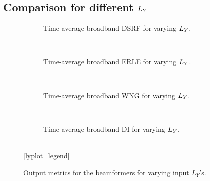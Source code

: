 \subsection{Comparison for different $\Ly$}
\begin{figure}[H]
	\centering
	\begin{subfigure}{0.48\textwidth}
		\centering
		
		\caption{Time-average broadband DSRF for varying $\Ly$.}
		\label{subfig:lineplot__DSRF__iSER_n15__Ly_var}
	\end{subfigure}\\[1em]
	\begin{subfigure}{0.48\textwidth}
		\centering
		
		\caption{Time-average broadband ERLE for varying $\Ly$.}
		\label{subfig:lineplot__ERLE__iSER_n15__Ly_var}
	\end{subfigure}\\[1em]
	\begin{subfigure}{0.48\textwidth}
		\centering
		
		\caption{Time-average broadband WNG for varying $\Ly$.}
		\label{subfig:lineplot__WNG__iSER_n15__Ly_var}
	\end{subfigure}\\[1em]
	\begin{subfigure}{0.48\textwidth}
		\centering
		
		\caption{Time-average broadband DI for varying $\Ly$.}
		\label{subfig:lineplot__DI__iSER_n15__Ly_var}
	\end{subfigure}\\[1em]
	\ref*{lyplot_legend}
	\caption{Output metrics for the beamformers for varying input $L_Y$'s.}
	\label{fig:lineplot__iSER_n15__Ly_var}
\end{figure}

